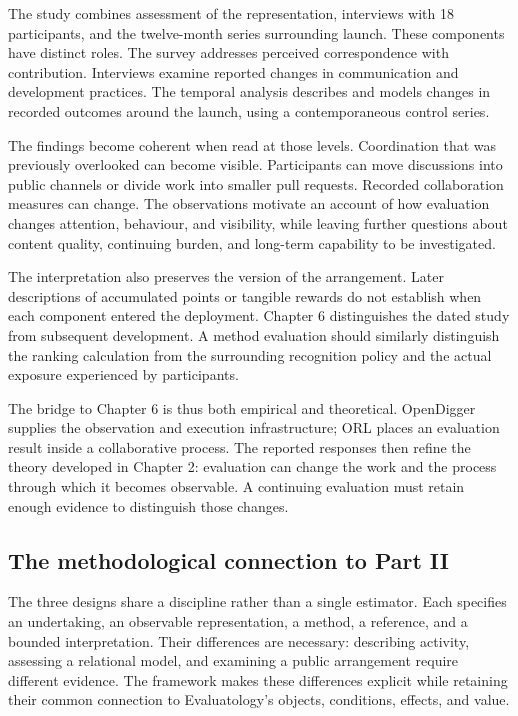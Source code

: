 The study combines assessment of the representation, interviews with 18 participants, and the twelve-month series surrounding launch. These components have distinct roles. The survey addresses perceived correspondence with contribution. Interviews examine reported changes in communication and development practices. The temporal analysis describes and models changes in recorded outcomes around the launch, using a contemporaneous control series.

The findings become coherent when read at those levels. Coordination that was previously overlooked can become visible. Participants can move discussions into public channels or divide work into smaller pull requests. Recorded collaboration measures can change. The observations motivate an account of how evaluation changes attention, behaviour, and visibility, while leaving further questions about content quality, continuing burden, and long-term capability to be investigated.

The interpretation also preserves the version of the arrangement. Later descriptions of accumulated points or tangible rewards do not establish when each component entered the deployment. Chapter 6 distinguishes the dated study from subsequent development. A method evaluation should similarly distinguish the ranking calculation from the surrounding recognition policy and the actual exposure experienced by participants.

The bridge to Chapter 6 is thus both empirical and theoretical. OpenDigger supplies the observation and execution infrastructure; ORL places an evaluation result inside a collaborative process. The reported responses then refine the theory developed in Chapter 2: evaluation can change the work and the process through which it becomes observable. A continuing evaluation must retain enough evidence to distinguish those changes.

\subsection{The methodological connection to Part II}
The three designs share a discipline rather than a single estimator. Each specifies an undertaking, an observable representation, a method, a reference, and a bounded interpretation. Their differences are necessary: describing activity, assessing a relational model, and examining a public arrangement require different evidence. The framework makes these differences explicit while retaining their common connection to Evaluatology's objects, conditions, effects, and value.


